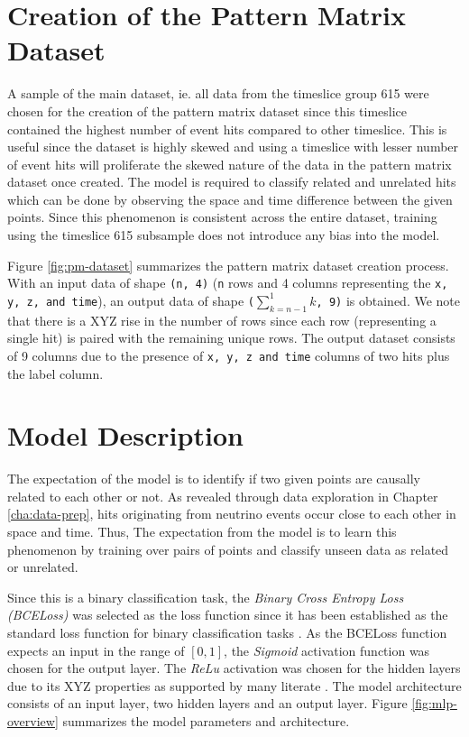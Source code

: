 \section{Creation of the Pattern Matrix Dataset}\label{sec:create-pattern-matrix}
A sample of the main dataset, ie. all data from the timeslice group
615 were chosen for the creation of the pattern matrix dataset since
this timeslice contained the highest number of event hits compared to
other timeslice. This is useful since the dataset is highly skewed and
using a timeslice with lesser number of event hits will proliferate
the skewed nature of the data in the pattern matrix dataset once
created. The model is required to classify related and unrelated hits
which can be done by observing the space and time difference between
the given points. Since this phenomenon is consistent across the
entire dataset, training using the timeslice 615 subsample does not
introduce any bias into the model.

Figure \ref{fig:pm-dataset} summarizes the pattern matrix dataset
creation process. With an input data of shape \texttt{(n, 4)}
(\texttt{n} rows and 4 columns representing the \texttt{x, y, z, and
  time}), an output data of shape \texttt{($\sum_{k=n-1}^{1}k$, 9)} is
obtained. We note that there is a XYZ rise in the number of rows since
each row (representing a single hit) is paired with the remaining
unique rows. The output dataset consists of 9 columns due to the
presence of \texttt{x, y, z and time} columns of two hits plus the
label column.

\section{Model Description}
The expectation of the model is to identify if two given points are
causally related to each other or not. As revealed through data
exploration in Chapter \ref{cha:data-prep}, hits originating from
neutrino events occur close to each other in space and time. Thus, The
expectation from the model is to learn this phenomenon by training
over pairs of points and classify unseen data as related or unrelated.

Since this is a binary classification task, the \textit{Binary Cross
  Entropy Loss (BCELoss)} was selected as the loss function since it
has been established as the standard loss function for binary
classification tasks \cite{CITEME}. As the BCELoss function expects an
input in the range of $[0, 1]$, the \textit{Sigmoid} activation
function was chosen for the output layer. The \textit{ReLu} activation
was chosen for the hidden layers due to its XYZ properties as
supported by many literate \cite{CITME}. The model architecture
consists of an input layer, two hidden layers and an output layer.
Figure \ref{fig:mlp-overview} summarizes the model parameters and
architecture.

